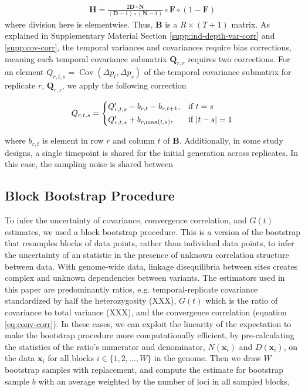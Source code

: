 \documentclass[11pt]{article}
\DeclareMathOperator{\cov}{Cov}
\begin{document}
\begin{align}
  \mathbf{H} = \frac{2 \mathbf{D} \circ \mathbf{N} }{ (\mathbf{D}-1) \circ (\mathbf{N} -1)} \circ \mathbf{F} \circ (1-\mathbf{F})
\end{align}
%
where division here is elementwise. Thus, $\mathbf{B}$ is a $R \times (T+1)$
matrix. As explained in Supplementary Material Section
\ref{supp:ind-depth-var-corr} and \ref{supp:cov-corr}, the temporal variances
and covariances require bias corrections, meaning each temporal covariance
submatrix $\mathbf{Q}_{r,r}$ requires two corrections. For an element
$Q_{r,t,s} = \cov(\Delta p_t, \Delta p_s)$ of the temporal covariance submatrix
for replicate $r$, $\mathbf{Q}_{r,r}$, we apply the following correction

\begin{equation}
	Q_{r,t,s} =  
		\begin{dcases}
			Q_{r,t,s}' - b_{r,t} - b_{r,t+1}, & \text{if  } t = s \\
      Q_{r,t,s}' + b_{r,\max(t,s)}, & \text{if  } |t - s| = 1 \\
		\end{dcases}
\end{equation}

where $b_{r,t}$ is element in row $r$ and column $t$ of $\mathbf{B}$.
Additionally, in some study designs, a single timepoint is shared for the
initial generation across replicates. In this case, the sampling noise is
shared between 



\subsection{Block Bootstrap Procedure}
\label{supp:block-bootstrap}

To infer the uncertainty of covariance, convergence correlation, and $G(t)$
estimates, we used a block bootstrap procedure. This is a version of the
bootstrap that resamples blocks of data points, rather than individual data
points, to infer the uncertainty of an statistic in the presence of unknown
correlation structure between data. With genome-wide data, linkage
disequilibria between sites creates complex and unknown dependencies between
variants. The estimators used in this paper are predominantly ratios, e.g.
temporal-replicate covariance standardized by half the heterozygosity (XXX),
$G(t)$ which is the ratio of covariance to total variance (XXX), and the
convergence correlation (equation \eqref{eq:conv-corr}). In these cases, we can
exploit the linearity of the expectation to make the bootstrap procedure more
computationally efficient, by pre-calculating the statistics of the ratio's
numerator and denominator, $N(\mathbf{x}_i)$ and $D(\mathbf{x}_i)$, on the data
$\mathbf{x}_i$ for all blocks $i \in \{1, 2, \ldots, W\}$ in the genome. Then
we draw $W$ bootstrap samples with replacement, and compute the estimate for
bootstrap sample $b$ with an average weighted by the number of loci in all
sampled blocks, 
\end{document}
